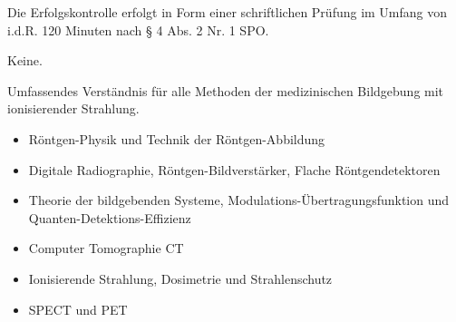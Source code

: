\begin{course}

\setdoclanguagegerman
{}



\coursehead


\label{cour_8135.dp_997}


\begin{styleenv}
\begin{assessment}
Die Erfolgskontrolle erfolgt in Form einer schriftlichen Prüfung im Umfang von i.d.R. 120 Minuten nach § 4 Abs. 2 Nr. 1 SPO.


\end{assessment}

\begin{conditions}Keine.\end{conditions}


\end{styleenv}

\begin{learningoutcomes}
Umfassendes Verständnis für alle Methoden der medizinischen Bildgebung mit ionisierender Strahlung.


\end{learningoutcomes}

\begin{content}
\begin{itemize}\item  Röntgen-Physik und Technik der Röntgen-Abbildung  \item  Digitale Radiographie, Röntgen-Bildverstärker, Flache Röntgendetektoren  \item  Theorie der bildgebenden Systeme, Modulations-Übertragungsfunktion und Quanten-Detektions-Effizienz  \item  Computer Tomographie CT  \item  Ionisierende Strahlung, Dosimetrie und Strahlenschutz  \item  SPECT und PET  \end{itemize}
\end{content}







\end{course}